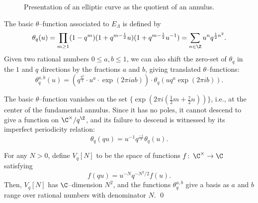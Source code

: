 \begin{figure}
\begin{center}
\end{center}
\caption{Presentation of an elliptic curve as the quotient of an annulus.}\label{AnnulusPicture}
\end{figure}

\begin{definition}
The basic $\theta$--function associated to $E_\Lambda$ is defined by \[\theta_q(u) = \prod_{m \ge 1} (1 - q^m) (1 + q^{m-\frac{1}{2}}u) (1 + q^{m-\frac{1}{2}}u^{-1}) = \sum_{n \in \Z} u^n q^{\frac{1}{2} n^2}.\]  Given two rational numbers $0 \le a, b \le 1$, we can also shift the zero-set of $\theta_q$ in the $1$ and $q$ directions by the fractions $a$ and $b$, giving translated $\theta$--functions: \[\theta_q^{a,b}(u) = \left(q^{\frac{a^2}{2}} \cdot u^a \cdot \exp(2 \pi i a b) \right) \cdot \theta_q(u q^a \exp(2 \pi i b)).\]
\end{definition}

The basic $\theta$--function vanishes on the set $\{\exp(2 \pi i (\frac{1}{2}m + \frac{\tau}{2}n))\}$, i.e., at the center of the fundamental annulus.  Since it has no poles, it cannot descend to give a function on $\C^\times / q^{\Z}$, and its failure to descend is witnessed by its imperfect periodicity relation: \[\theta_q(qu) = u^{-1} q^{\frac{-1}{2}} \theta_q(u).\]

\begin{lemma}
For any $N > 0$, define $V_q[N]$ to be the space of functions $f\co \C^\times \to \C$ satisfying \[f(q u) = u^{-N}  q^{-N^2/2} f(u).\]  Then, $V_q[N]$ has $\C$--dimension $N^2$, and the functions $\theta_q^{a, b}$ give a basis as $a$ and $b$ range over rational numbers with denominator $N$. \qed
\end{lemma}

